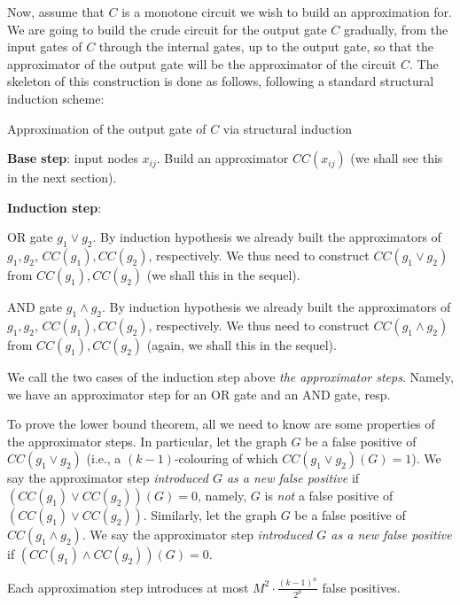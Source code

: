  




Now, assume that $C$ is a monotone circuit we wish to build an approximation for. We are going to build the crude circuit for the output gate $C$ gradually, from the input gates of $C$  through the internal gates, up to the output gate, so that the approximator of the output gate will be the approximator of the circuit $C$. The skeleton of this construction is done as follows, following a standard structural induction scheme:

\begin{trailer}
{Approximation of the output gate of $C$ via structural induction}

\textbf{Base step}: input nodes $x_{ij}$. Build an approximator $CC(x_{ij})$ (we shall see this in the next section).


\textbf{Induction step}: 

 OR gate $g_1\lor g_2$. By induction hypothesis we already built the approximators of $g_1,g_2$, $CC(g_1),CC(g_2)$, respectively. We thus need to construct $CC(g_1\lor g_2)$ from $CC(g_1),CC(g_2)$ (we shall this in the sequel).

 AND gate $g_1\land g_2$. 
By induction hypothesis we already built the approximators 
of $g_1,g_2$, $CC(g_1),CC(g_2)$, respectively. 
We thus need to construct $CC(g_1\land g_2)$ from 
$CC(g_1),CC(g_2)$ (again, we shall this in the sequel).
\end{trailer}

 We call the two cases of the induction step above \emph{the approximator steps}. Namely, we have an approximator step for an OR gate and an AND gate, resp. 

To prove the lower bound theorem, all we need to know are some properties of the approximator steps. In particular, let the graph $G$ be a false positive of $CC(g_1\lor g_2)$ (i.e., a $(k-1)$-colouring of which $CC(g_1\lor g_2)(G)=1$).
We say the approximator step \emph{introduced $G$ as a new false positive} if $(CC(g_1)\lor CC(g_2))(G)=0$, namely, $G$ is \emph{not} a false positive of $(CC(g_1)\lor CC(g_2))$.
Similarly, let the graph $G$ be a false positive of $CC(g_1\land g_2)$. We say the approximator step \emph{introduced $G$ as a new false positive} if $(CC(g_1)\land CC(g_2))(G)=0$.
 







\begin{lemma}\label{lem:new-false-positives}
Each approximation step introduces at most $M^2 \cdot \frac{(k-1)^n}{2^p}$ false positives.
\end{lemma}

